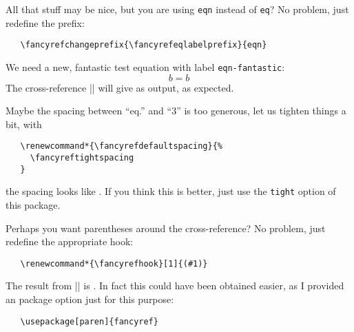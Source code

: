 \documentclass{article}
\newcommand*{\labelname}[1]{\texttt{#1}}
\newcommand*{\option}[1]{\texttt{#1}}
\newcommand*{\prefix}[1]{\texttt{#1}}
\newcommand*{\stringdef}[1]{``#1''}
\begin{document}
All that stuff may be nice, but you are using \prefix{eqn} instead of
\prefix{eq}?  No problem, just redefine the prefix:
\begin{verbatim}
   \fancyrefchangeprefix{\fancyrefeqlabelprefix}{eqn}
\end{verbatim}
We need a new, fantastic test equation with label
\labelname{eqn-fantastic}:
\begin{equation}
  \label{eqn-fantastic}
  b = b
\end{equation}
The cross-reference || will give
 as output, as expected.

Maybe the spacing between \stringdef{eq.} and ``3'' is too generous,
let us tighten things a bit, with
\renewcommand*{\fancyrefdefaultspacing}{\fancyreftightspacing}
\begin{verbatim}
   \renewcommand*{\fancyrefdefaultspacing}{%
     \fancyreftightspacing
   }
\end{verbatim}
the spacing looks like .  If you think this is
better, just use the \option{tight} option of this package.

Perhaps you want parentheses around the cross-reference?  No problem,
just redefine the appropriate hook:
\renewcommand*{\fancyrefhook}[1]{(#1)}
\begin{verbatim}
   \renewcommand*{\fancyrefhook}[1]{(#1)}
\end{verbatim}
The result from || is .  In fact
this could have been obtained easier, as I provided an package option
just for this purpose:
\begin{verbatim}
   \usepackage[paren]{fancyref}
\end{verbatim}
\end{document}
